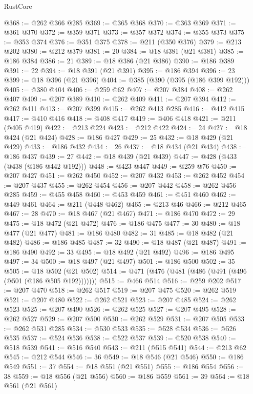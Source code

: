 \begin{lexlean}{RustCore}
\begin{coremodule}
@368 := @262 @366 @285
@369 := @365 @368
@370 := @363 @369
@371 := @361 @370
@372 := @359 @371
@373 := @357 @372
@374 := @355 @373
@375 := @353 @374
@376 := @351 @375
@378 := @211 (@350 @376)
@379 := @213 @202
@380 := @212 @379
@381 := 20
@384 := @18 @381 (@21 @381)
@385 := @186 @384
@386 := 21
@389 := @18 @386 (@21 @386)
@390 := @186 @389
@391 := 22
@394 := @18 @391 (@21 @391)
@395 := @186 @394
@396 := 23
@399 := @18 @396 (@21 @396)
@404 := @385 (@390 (@395 (@186 @399 @192)))
@405 := @380 @404
@406 := @259 @62
@407 := @207 @384
@408 := @262 @407
@409 := @207 @389
@410 := @262 @409
@411 := @207 @394
@412 := @262 @411
@413 := @207 @399
@415 := @262 @413 @285
@416 := @412 @415
@417 := @410 @416
@418 := @408 @417
@419 := @406 @418
@421 := @211 (@405 @419)
@422 := @213 @224
@423 := @212 @422
@424 := 24
@427 := @18 @424 (@21 @424)
@428 := @186 @427
@429 := 25
@432 := @18 @429 (@21 @429)
@433 := @186 @432
@434 := 26
@437 := @18 @434 (@21 @434)
@438 := @186 @437
@439 := 27
@442 := @18 @439 (@21 @439)
@447 := @428 (@433 (@438 (@186 @442 @192)))
@448 := @423 @447
@449 := @259 @76
@450 := @207 @427
@451 := @262 @450
@452 := @207 @432
@453 := @262 @452
@454 := @207 @437
@455 := @262 @454
@456 := @207 @442
@458 := @262 @456 @285
@459 := @455 @458
@460 := @453 @459
@461 := @451 @460
@462 := @449 @461
@464 := @211 (@448 @462)
@465 := @213 @46
@466 := @212 @465
@467 := 28
@470 := @18 @467 (@21 @467)
@471 := @186 @470
@472 := 29
@475 := @18 @472 (@21 @472)
@476 := @186 @475
@477 := 30
@480 := @18 @477 (@21 @477)
@481 := @186 @480
@482 := 31
@485 := @18 @482 (@21 @482)
@486 := @186 @485
@487 := 32
@490 := @18 @487 (@21 @487)
@491 := @186 @490
@492 := 33
@495 := @18 @492 (@21 @492)
@496 := @186 @495
@497 := 34
@500 := @18 @497 (@21 @497)
@501 := @186 @500
@502 := 35
@505 := @18 @502 (@21 @502)
@514 := @471 (@476 (@481 (@486 (@491 (@496 (@501 (@186 @505 @192)))))))
@515 := @466 @514
@516 := @259 @202
@517 := @207 @470
@518 := @262 @517
@519 := @207 @475
@520 := @262 @519
@521 := @207 @480
@522 := @262 @521
@523 := @207 @485
@524 := @262 @523
@525 := @207 @490
@526 := @262 @525
@527 := @207 @495
@528 := @262 @527
@529 := @207 @500
@530 := @262 @529
@531 := @207 @505
@533 := @262 @531 @285
@534 := @530 @533
@535 := @528 @534
@536 := @526 @535
@537 := @524 @536
@538 := @522 @537
@539 := @520 @538
@540 := @518 @539
@541 := @516 @540
@543 := @211 (@515 @541)
@544 := @213 @62
@545 := @212 @544
@546 := 36
@549 := @18 @546 (@21 @546)
@550 := @186 @549
@551 := 37
@554 := @18 @551 (@21 @551)
@555 := @186 @554
@556 := 38
@559 := @18 @556 (@21 @556)
@560 := @186 @559
@561 := 39
@564 := @18 @561 (@21 @561)

\end{coremodule}
\end{lexlean}
